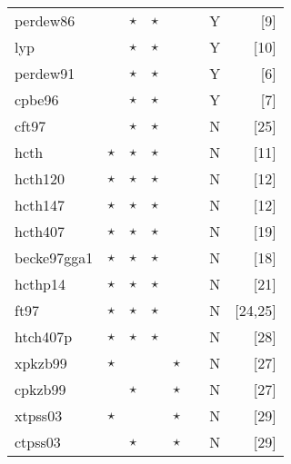 \begin{table}[htp]
\begin{tabular}{|l|cccccc|r|}
perdew86   &          &   $\star$   &  $\star$  &   &       &  Y   &[9]\\
lyp        &          &   $\star$   &  $\star$  &   &       &  Y   &[10]\\
perdew91   &          &   $\star$   &  $\star$  &   &       &  Y   &[6]\\
cpbe96     &          &   $\star$   &  $\star$  &   &       &  Y   &[7]\\
cft97      &          &   $\star$   &  $\star$  &   &       &  N   &[25]\\
\hline                                                  
hcth       & $\star$  &   $\star$   &  $\star$  &   &       &  N   &[11]\\
hcth120    & $\star$  &   $\star$   &  $\star$  &   &       &  N   &[12]\\
hcth147    & $\star$  &   $\star$   &  $\star$  &   &       &  N   &[12]\\
hcth407    & $\star$  &   $\star$   &  $\star$  &   &       &  N   &[19]\\
becke97gga1 & $\star$ &   $\star$   &  $\star$  &   &       &  N   &[18]\\
hcthp14    & $\star$  &   $\star$   &  $\star$  &   &       &  N   &[21]\\
ft97       & $\star$  &   $\star$   &  $\star$  &   &       &  N   &[24,25]\\
htch407p   & $\star$  &   $\star$   &  $\star$  &   &       &  N   &[28]\\
\hline                                                  
xpkzb99    & $\star$  &             &           &$\star$&   &  N   &[27]\\
cpkzb99    &          &  $\star$    &           &$\star$&   &  N   &[27]\\
xtpss03    & $\star$  &             &           &$\star$&   &  N   &[29]\\
ctpss03    &          &  $\star$    &           &$\star$&   &  N   &[29]\\


\end{tabular}
\end{table}
